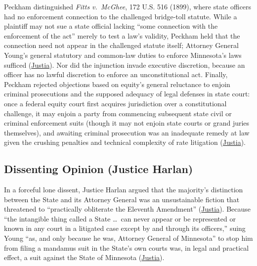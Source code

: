 \documentclass[12pt]{article}
\begin{document}
Peckham distinguished \textit{Fitts v.\ McGhee}, 172 U.S. 516 (1899), where state officers had no enforcement connection to the challenged bridge-toll statute. While a plaintiff may not sue a state official lacking ``some connection with the enforcement of the act'' merely to test a law's validity, Peckham held that the connection need not appear in the challenged statute itself; Attorney General Young's general statutory and common-law duties to enforce Minnesota's laws sufficed (\href{https://supreme.justia.com/cases/federal/us/209/123/}{Justia}). Nor did the injunction invade executive discretion, because an officer has no lawful discretion to enforce an unconstitutional act. Finally, Peckham rejected objections based on equity's general reluctance to enjoin criminal prosecutions and the supposed adequacy of legal defenses in state court: once a federal equity court first acquires jurisdiction over a constitutional challenge, it may enjoin a party from commencing subsequent state civil or criminal enforcement suits (though it may not enjoin state courts or grand juries themselves), and awaiting criminal prosecution was an inadequate remedy at law given the crushing penalties and technical complexity of rate litigation (\href{https://supreme.justia.com/cases/federal/us/209/123/}{Justia}).

\subsection{Dissenting Opinion (Justice Harlan)}

In a forceful lone dissent, Justice Harlan argued that the majority's distinction between the State and its Attorney General was an unsustainable fiction that threatened to ``practically obliterate the Eleventh Amendment'' (\href{https://supreme.justia.com/cases/federal/us/209/123/}{Justia}). Because ``the intangible thing called a State \ldots\ can never appear or be represented or known in any court in a litigated case except by and through its officers,'' suing Young ``as, and only because he was, Attorney General of Minnesota'' to stop him from filing a mandamus suit in the State's own courts was, in legal and practical effect, a suit against the State of Minnesota (\href{https://supreme.justia.com/cases/federal/us/209/123/}{Justia}).
\end{document}
